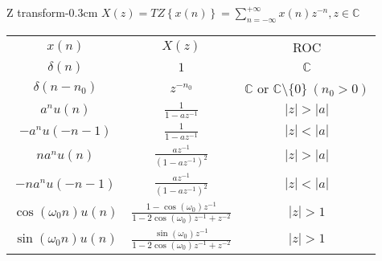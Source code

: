 \documentclass[10pt,3col]{cheatsheet}
\begin{document}
\begin{multicols*}{3}
\begin{cheatsheetbox}{Z transform}{-0.3cm}
	$X(z) = TZ\left\{x(n)\right\} = \sum_{n = -\infty}^{+\infty} x(n) z^{-n}, z \in \mathbb{C}$\\
    \begin{tabular}{c c c}
        $x(n)$ & $X(z)$ & ROC \\
	    $\delta(n)$ & $1$ & $\mathbb{C}$ \\
        $\delta(n - n_0)$ & $z^{-n_0}$ & $\mathbb{C}$ or $\mathbb{C} \setminus \{0\} \ (n_0 > 0)$ \\
        $a^nu(n)$ & $\frac{1}{1 - az^{-1}}$ & $|z| > |a|$ \\
        $-a^nu(-n-1)$ & $\frac{1}{1 - az^{-1}}$ & $|z| < |a|$ \\
        $na^nu(n)$ & $\frac{az^{-1}}{(1 - az^{-1})^2}$ & $|z| > |a|$ \\
        $-na^nu(-n-1)$ & $\frac{az^{-1}}{(1 - az^{-1})^2}$ & $|z| < |a|$ \\
        $\cos(\omega_0 n)u(n)$ & $\frac{1 - \cos(\omega_0)z^{-1}}{1 - 2\cos(\omega_0)z^{-1} + z^{-2}}$ & $|z| > 1$ \\
        $\sin(\omega_0 n)u(n)$ & $\frac{\sin(\omega_0)z^{-1}}{1 - 2\cos(\omega_0)z^{-1} + z^{-2}}$ & $|z| > 1$ \\
	\end{tabular} \\
\end{cheatsheetbox}

\sectionbreak

\makecheatsheettitle


\end{multicols*}
\end{document}
